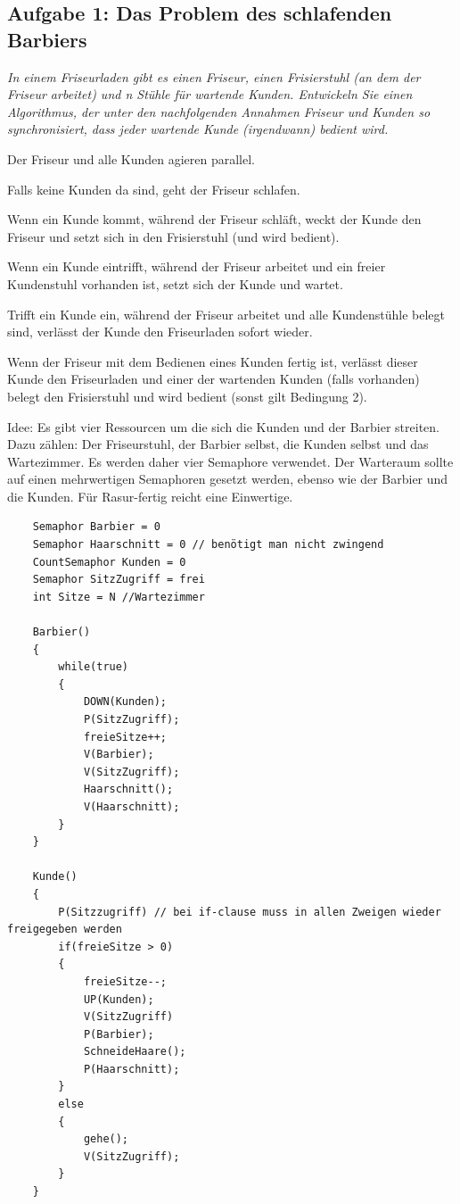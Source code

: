 \documentclass[a4paper]{article}
\begin{document}
\subsection{Aufgabe 1: Das Problem des schlafenden Barbiers}
\textit{In einem Friseurladen gibt es einen Friseur, einen Frisierstuhl (an dem der Friseur arbeitet) und n Stühle für wartende Kunden. Entwickeln Sie einen Algorithmus, der unter den nachfolgenden Annahmen Friseur und Kunden so synchronisiert, dass jeder wartende Kunde (irgendwann) bedient wird.}
\begin{itemize*}
    \item Der Friseur und alle Kunden agieren parallel.
    \item Falls keine Kunden da sind, geht der Friseur schlafen.
    \item Wenn ein Kunde kommt, während der Friseur schläft, weckt der Kunde den Friseur und setzt sich in den Frisierstuhl (und wird bedient).
    \item Wenn ein Kunde eintrifft, während der Friseur arbeitet und ein freier Kundenstuhl vorhanden ist, setzt sich der Kunde und wartet.
    \item Trifft ein Kunde ein, während der Friseur arbeitet und alle Kundenstühle belegt sind, verlässt der Kunde den Friseurladen sofort wieder.
    \item Wenn der Friseur mit dem Bedienen eines Kunden fertig ist, verlässt dieser Kunde den Friseurladen und einer der wartenden Kunden (falls vorhanden) belegt den Frisierstuhl und wird bedient (sonst gilt Bedingung 2).
\end{itemize*}
\vspace{10mm}
Idee: Es gibt vier Ressourcen um die sich die Kunden und der Barbier streiten. Dazu zählen: Der Friseurstuhl, der Barbier selbst, die Kunden selbst und das Wartezimmer. Es werden daher vier Semaphore verwendet. Der Warteraum sollte auf einen mehrwertigen Semaphoren gesetzt werden, ebenso wie der Barbier und die Kunden. Für Rasur-fertig reicht eine Einwertige.

\begin{lstlisting}
    Semaphor Barbier = 0
    Semaphor Haarschnitt = 0 // benötigt man nicht zwingend
    CountSemaphor Kunden = 0
    Semaphor SitzZugriff = frei
    int Sitze = N //Wartezimmer
    
    Barbier()
    {
        while(true)
        {
            DOWN(Kunden);
            P(SitzZugriff);
            freieSitze++; 
            V(Barbier);
            V(SitzZugriff);
            Haarschnitt();
            V(Haarschnitt);
        }
    }
    
    Kunde()
    {
        P(Sitzzugriff) // bei if-clause muss in allen Zweigen wieder freigegeben werden
        if(freieSitze > 0)
        {
            freieSitze--;
            UP(Kunden);
            V(SitzZugriff)
            P(Barbier);
            SchneideHaare(); 
            P(Haarschnitt);	
        }
        else 
        {
            gehe(); 
            V(SitzZugriff);
        }
    }
    \end{lstlisting}
\end{document}
